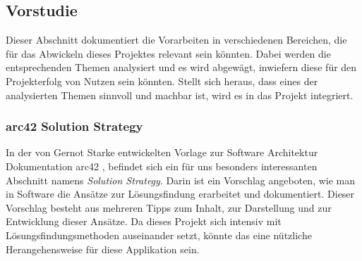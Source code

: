 \subsection{Vorstudie}
Dieser Abschnitt dokumentiert die Vorarbeiten in verschiedenen Bereichen, die für das Abwickeln dieses Projektes relevant sein könnten. Dabei werden die entsprechenden Themen analysiert und es wird abgewägt, inwiefern diese für den Projekterfolg von Nutzen sein könnten. Stellt sich heraus, dass eines der analysierten Themen sinnvoll und machbar ist, wird es in das Projekt integriert.
\subsubsection{arc42 Solution Strategy}
In der von Gernot Starke entwickelten Vorlage zur Software Architektur Dokumentation arc42 \cite{arc-42}, befindet sich ein für uns besonders interessanten Abschnitt namens \textit{Solution Strategy}. Darin ist ein Vorschlag angeboten, wie man in Software die Ansätze zur Lösungsfindung erarbeitet und dokumentiert. Dieser Vorschlag besteht aus mehreren Tipps zum Inhalt, zur Darstellung und zur Entwicklung dieser Ansätze. Da dieses Projekt sich intensiv mit Lösungsfindungsmethoden auseinander setzt, könnte das eine nützliche Herangehensweise für diese Applikation sein. 

